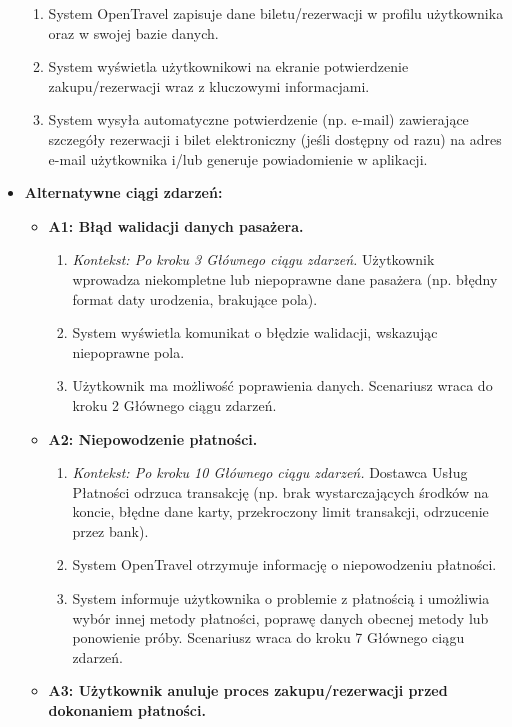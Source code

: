 \documentclass[a4paper,12pt]{article}
\begin{document}
\begin{itemize}
\begin{enumerate}
            \item System OpenTravel zapisuje dane biletu/rezerwacji w profilu użytkownika oraz w swojej bazie danych.
            \item System wyświetla użytkownikowi na ekranie potwierdzenie zakupu/rezerwacji wraz z kluczowymi informacjami.
            \item System wysyła automatyczne potwierdzenie (np. e-mail) zawierające szczegóły rezerwacji i bilet elektroniczny (jeśli dostępny od razu) na adres e-mail użytkownika i/lub generuje powiadomienie w aplikacji.
        \end{enumerate}
    \item \textbf{Alternatywne ciągi zdarzeń:}
        \begin{itemize}
            \item \textbf{A1: Błąd walidacji danych pasażera.}
                \begin{enumerate}
                    \item \textit{Kontekst: Po kroku 3 Głównego ciągu zdarzeń.} Użytkownik wprowadza niekompletne lub niepoprawne dane pasażera (np. błędny format daty urodzenia, brakujące pola).
                    \item System wyświetla komunikat o błędzie walidacji, wskazując niepoprawne pola.
                    \item Użytkownik ma możliwość poprawienia danych. Scenariusz wraca do kroku 2 Głównego ciągu zdarzeń.
                \end{enumerate}
            \item \textbf{A2: Niepowodzenie płatności.}
                \begin{enumerate}
                    \item \textit{Kontekst: Po kroku 10 Głównego ciągu zdarzeń.} Dostawca Usług Płatności odrzuca transakcję (np. brak wystarczających środków na koncie, błędne dane karty, przekroczony limit transakcji, odrzucenie przez bank).
                    \item System OpenTravel otrzymuje informację o niepowodzeniu płatności.
                    \item System informuje użytkownika o problemie z płatnością i umożliwia wybór innej metody płatności, poprawę danych obecnej metody lub ponowienie próby. Scenariusz wraca do kroku 7 Głównego ciągu zdarzeń.
                \end{enumerate}
            \item \textbf{A3: Użytkownik anuluje proces zakupu/rezerwacji przed dokonaniem płatności.}

\end{itemize}
\end{itemize}
\end{document}
